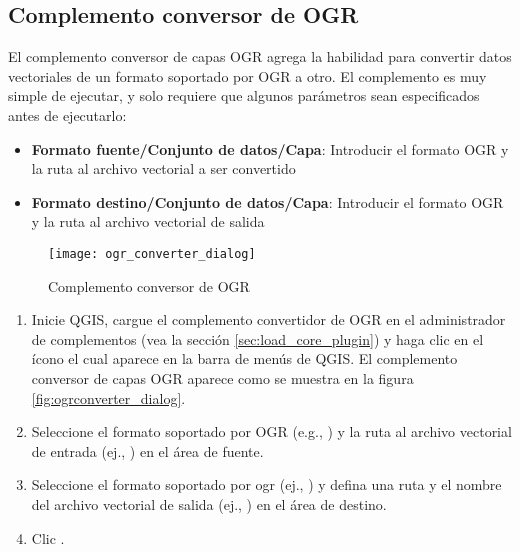 
\subsection{Complemento conversor de OGR}


El complemento conversor de capas OGR agrega la habilidad para convertir datos vectoriales de un formato soportado por OGR a otro.
El complemento es muy simple de ejecutar, y solo requiere que algunos parámetros sean especificados antes de ejecutarlo:  


\begin{itemize}
\item \textbf{Formato fuente/Conjunto de datos/Capa}: Introducir el formato OGR y la ruta al archivo vectorial a ser convertido
\item \textbf{Formato destino/Conjunto de datos/Capa}: Introducir el formato OGR y la ruta al archivo vectorial de salida
\end{itemize}

\begin{figure}[ht]
   \begin{center}
   \caption{Complemento conversor de OGR \nixcaption}\label{fig:ogr_converter_dialog}\smallskip
   \texttt{[image: ogr\_converter\_dialog]}
\end{center}  
\end{figure}


\begin{enumerate}
  \item Inicie QGIS, cargue el complemento convertidor de OGR en el administrador de complementos (vea la sección 
  \ref{sec:load_core_plugin}) y haga clic en el ícono  
 el cual aparece en la barra de menús de QGIS. El complemento conversor de capas OGR aparece como se muestra en la figura \ref{fig:ogrconverter_dialog}.
  \item Seleccione el formato soportado por OGR (e.g., ) y la ruta al archivo vectorial de entrada (ej., ) en el área de fuente.
  \item Seleccione el formato soportado por ogr (ej., ) y defina una ruta y el nombre del archivo vectorial de salida (ej., ) en el área de destino.
  \item Clic .
\end{enumerate}

\newpage
